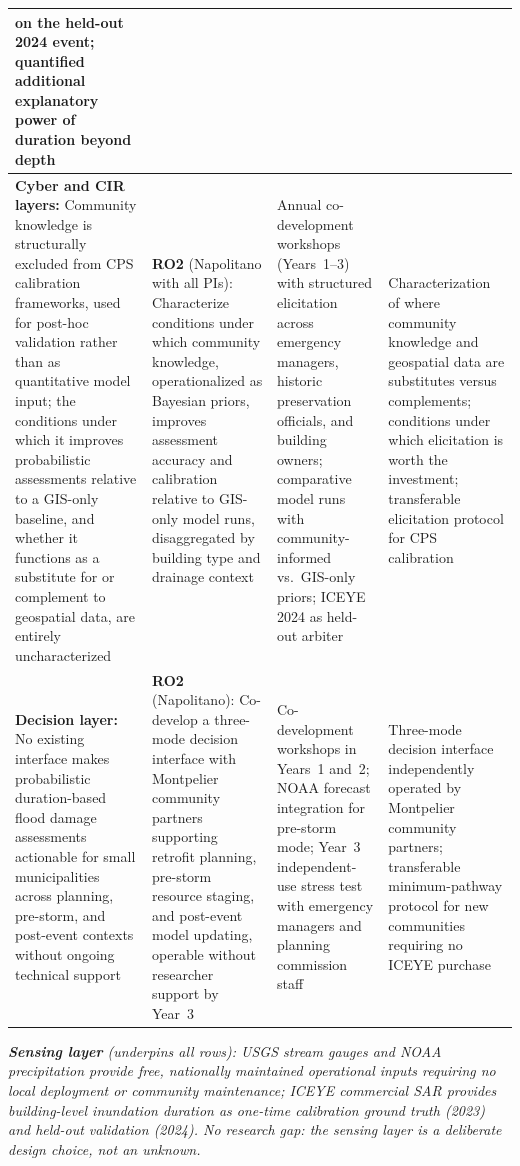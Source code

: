\documentclass[11pt]{article}
\begin{document}
\begin{tabularx}{\textwidth}{|X|X|X|X|}
on the held-out 2024 event; quantified additional explanatory power of duration
beyond depth \\
\hline
\textbf{Cyber and CIR layers:} Community knowledge is structurally excluded from
CPS calibration frameworks, used for post-hoc validation rather than as quantitative
model input; the conditions under which it improves probabilistic assessments
relative to a GIS-only baseline, and whether it functions as a substitute for or
complement to geospatial data, are entirely uncharacterized &
\textbf{RO2} (Napolitano with all PIs): Characterize conditions under which community
knowledge, operationalized as Bayesian priors, improves assessment accuracy and
calibration relative to GIS-only model runs, disaggregated by building type and
drainage context &
Annual co-development workshops (Years~1--3) with structured elicitation across
emergency managers, historic preservation officials, and building owners;
comparative model runs with community-informed vs.\ GIS-only priors;
ICEYE 2024 as held-out arbiter &
Characterization of where community knowledge and geospatial data are substitutes
versus complements; conditions under which elicitation is worth the investment;
transferable elicitation protocol for CPS calibration \\
\hline
\textbf{Decision layer:} No existing interface makes probabilistic duration-based
flood damage assessments actionable for small municipalities across planning,
pre-storm, and post-event contexts without ongoing technical support &
\textbf{RO2} (Napolitano): Co-develop a three-mode decision interface with Montpelier
community partners supporting retrofit planning, pre-storm resource staging, and
post-event model updating, operable without researcher support by Year~3 &
Co-development workshops in Years~1 and~2; NOAA forecast integration for pre-storm
mode; Year~3 independent-use stress test with emergency managers and planning
commission staff &
Three-mode decision interface independently operated by Montpelier community partners;
transferable minimum-pathway protocol for new communities requiring no ICEYE purchase \\
\end{tabularx}
\vspace{2pt}
\footnotesize\textit{\textbf{Sensing layer} (underpins all rows): USGS stream
gauges and NOAA precipitation provide free, nationally maintained operational
inputs requiring no local deployment or community maintenance; ICEYE commercial
SAR provides building-level inundation duration as one-time calibration ground
truth (2023) and held-out validation (2024). No research gap: the sensing layer
is a deliberate design choice, not an unknown.}
\endgroup
\normalsize
\end{document}

